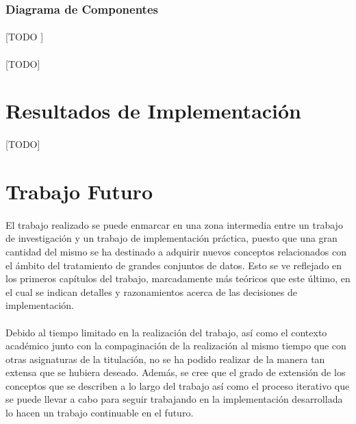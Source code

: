 \documentclass{subfiles}
\begin{document}
        \subsubsection{Diagrama de Componentes}
        \label{sec:components_diagram}

          \paragraph{}
          [TODO ]

      \paragraph{}
      [TODO]

    \section{Resultados de Implementación}
    \label{sec:implementation_results}

      \paragraph{}
      [TODO]

    \section{Trabajo Futuro}
    \label{sec:future_work}

      \paragraph{}
      El trabajo realizado se puede enmarcar en una zona intermedia entre un trabajo de investigación y un trabajo de implementación práctica, puesto que una gran cantidad del mismo se ha destinado a adquirir nuevos conceptos relacionados con el ámbito del tratamiento de grandes conjuntos de datos. Esto se ve reflejado en los primeros capítulos del trabajo, marcadamente más teóricos que este último, en el cual se indican detalles y razonamientos acerca de las decisiones de implementación.

      \paragraph{}
      Debido al tiempo limitado en la realización del trabajo, así como el contexto académico junto con la compaginación de la realización al mismo tiempo que con otras asignaturas de la titulación, no se ha podido realizar de la manera tan extensa que se hubiera deseado. Además, se cree que el grado de extensión de los conceptos que se describen a lo largo del trabajo así como el proceso iterativo que se puede llevar a cabo para seguir trabajando en la implementación desarrollada lo hacen un trabajo continuable en el futuro.
\end{document}
